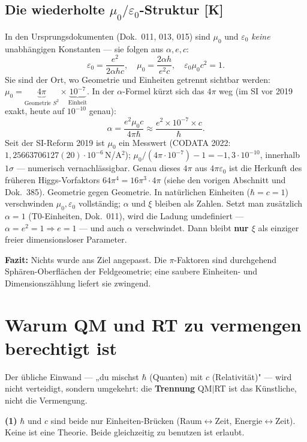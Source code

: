 \section{Die wiederholte $\mu_0/\varepsilon_0$-Struktur [K]}

In den Ursprungsdokumenten (Dok.~011, 013, 015) sind $\mu_0$ und
$\varepsilon_0$ \emph{keine} unabhängigen Konstanten — sie folgen aus
$\alpha, e, c$:
\[
  \varepsilon_0 = \frac{e^2}{2\alpha h c}, \quad
  \mu_0 = \frac{2\alpha h}{e^2 c}, \quad
  \varepsilon_0\mu_0 c^2 = 1.
\]
Sie sind der Ort, wo Geometrie und Einheiten getrennt sichtbar werden:
$\mu_0 = \underbrace{4\pi}_{\text{Geometrie }S^2} \times
\underbrace{10^{-7}}_{\text{Einheit}}$. In der $\alpha$-Formel kürzt
sich das $4\pi$ weg (im SI vor 2019 exakt, heute auf $10^{-10}$ genau):
\[
  \alpha = \frac{e^2\mu_0 c}{4\pi\hbar}
         \approx \frac{e^2 \times 10^{-7} \times c}{\hbar}.
\]
Seit der SI-Reform 2019 ist $\mu_0$ ein Messwert (CODATA 2022:
$1{,}25663706127(20)\cdot10^{-6}$\,N/A$^2$);
$\mu_0/(4\pi\cdot10^{-7})-1=-1{,}3\cdot10^{-10}$, innerhalb $1\sigma$ ---
numerisch vernachlässigbar. Genau dieses $4\pi$ aus $4\pi\varepsilon_0$
ist die Herkunft des früheren Higgs-Vorfaktors
$64\pi^4 = 16\pi^3\cdot 4\pi$ (siehe den vorigen Abschnitt und Dok.~385).
Geometrie gegen Geometrie. In natürlichen Einheiten ($\hbar = c = 1$)
verschwinden $\mu_0,\varepsilon_0$ vollständig; $\alpha$ und $\xi$
bleiben als Zahlen. Setzt man zusätzlich $\alpha = 1$ (T0-Einheiten,
Dok.~011), wird die Ladung umdefiniert — $\alpha = e^2 = 1 \Rightarrow
e = 1$ — und auch $\alpha$ verschwindet. Dann bleibt \textbf{nur $\xi$}
als einziger freier dimensionsloser Parameter.

\textbf{Fazit:} Nichts wurde ans Ziel angepasst. Die $\pi$-Faktoren sind
durchgehend Sphären-Oberflächen der Feldgeometrie; eine saubere
Einheiten- und Dimensionszählung liefert sie zwingend.

\chapter{Warum QM und RT zu vermengen berechtigt ist}

Der übliche Einwand — „du mischst $\hbar$ (Quanten) mit $c$
(Relativität)" — wird nicht verteidigt, sondern umgekehrt: die
\textbf{Trennung} QM$|$RT ist das Künstliche, nicht die Vermengung.

\textbf{(1)} $\hbar$ und $c$ sind beide nur Einheiten-Brücken (Raum$\leftrightarrow$Zeit,
Energie$\leftrightarrow$Zeit). Keine ist eine Theorie. Beide gleichzeitig zu
benutzen ist erlaubt.


